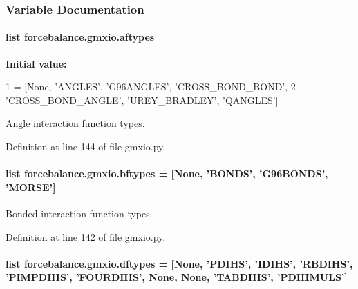 \subsubsection{Variable Documentation}
\hypertarget{namespaceforcebalance_1_1gmxio_aef89ff391902f81feb14e28ec301296c}{
\paragraph[{aftypes}]{\setlength{\rightskip}{0pt plus 5cm}list forcebalance.\-gmxio.\-aftypes}}\label{namespaceforcebalance_1_1gmxio_aef89ff391902f81feb14e28ec301296c}
{\bfseries Initial value\-:}
\begin{DoxyCode}
1 = [\textcolor{keywordtype}{None}, \textcolor{stringliteral}{'ANGLES'}, \textcolor{stringliteral}{'G96ANGLES'}, \textcolor{stringliteral}{'CROSS\_BOND\_BOND'},
2            \textcolor{stringliteral}{'CROSS\_BOND\_ANGLE'}, \textcolor{stringliteral}{'UREY\_BRADLEY'}, \textcolor{stringliteral}{'QANGLES'}]
\end{DoxyCode}


Angle interaction function types. 



Definition at line 144 of file gmxio.\-py.

\hypertarget{namespaceforcebalance_1_1gmxio_a49a34b85d405c9286ceec1e6f088069f}{
\paragraph[{bftypes}]{\setlength{\rightskip}{0pt plus 5cm}list forcebalance.\-gmxio.\-bftypes = \mbox{[}None, 'B\-O\-N\-D\-S', 'G96\-B\-O\-N\-D\-S', 'M\-O\-R\-S\-E'\mbox{]}}}\label{namespaceforcebalance_1_1gmxio_a49a34b85d405c9286ceec1e6f088069f}


Bonded interaction function types. 



Definition at line 142 of file gmxio.\-py.

\hypertarget{namespaceforcebalance_1_1gmxio_acd9fed3887161c6386506563fd4f3534}{
\paragraph[{dftypes}]{\setlength{\rightskip}{0pt plus 5cm}list forcebalance.\-gmxio.\-dftypes = \mbox{[}None, 'P\-D\-I\-H\-S', 'I\-D\-I\-H\-S', 'R\-B\-D\-I\-H\-S', 'P\-I\-M\-P\-D\-I\-H\-S', 'F\-O\-U\-R\-D\-I\-H\-S', None, None, 'T\-A\-B\-D\-I\-H\-S', 'P\-D\-I\-H\-M\-U\-L\-S'\mbox{]}}}\label{namespaceforcebalance_1_1gmxio_acd9fed3887161c6386506563fd4f3534}


